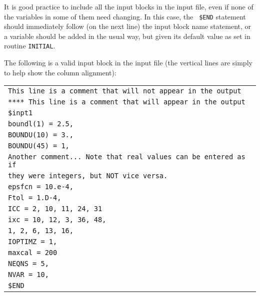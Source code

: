 It is good practice to include all the input blocks in the input file, even if
none of the variables in some of them need changing. In this case, the {\tt
\$END}
 statement should immediately follow (on the next line) the input block
name statement, or a variable should be added in the usual way, but given its
default value as set in routine {\tt INITIAL}.

The following is a valid input block in the input file (the vertical lines
are simply to help show the column alignment):
\begin{center}
\begin{tabular}{||l}
$\!\!$\tt * This line is a comment that will not appear in the output \\
$\!\!$\tt ***** This line is a comment that will appear in the output \\
$\!\!$\tt \$inpt1                      \\ %
$\!\!$\tt boundl(1) = 2.5,             \\
$\!\!$\tt BOUNDU(10) = 3.,             \\
$\!\!$\tt BOUNDU(45) = 1,              \\
$\!\!$\tt * Another comment... Note that real values can be entered as if \\
$\!\!$\tt * they were integers, but NOT vice versa. \\
$\!\!$\tt epsfcn = 10.e-4,             \\
$\!\!$\tt Ftol = 1.D-4,                \\
$\!\!$\tt ICC =   2, 10, 11, 24, 31    \\
$\!\!$\tt ixc =   10, 12, 3, 36, 48,   \\
$\!\!$\hspace{15mm}\tt 1, 2, 6, 13, 16,\\
$\!\!$\tt IOPTIMZ = 1,                 \\
$\!\!$\tt maxcal = 200                 \\
$\!\!$\tt NEQNS = 5,                   \\
$\!\!$\tt NVAR = 10,                   \\
$\!\!$\tt \$END                        \\  %
\end{tabular}
\end{center}

